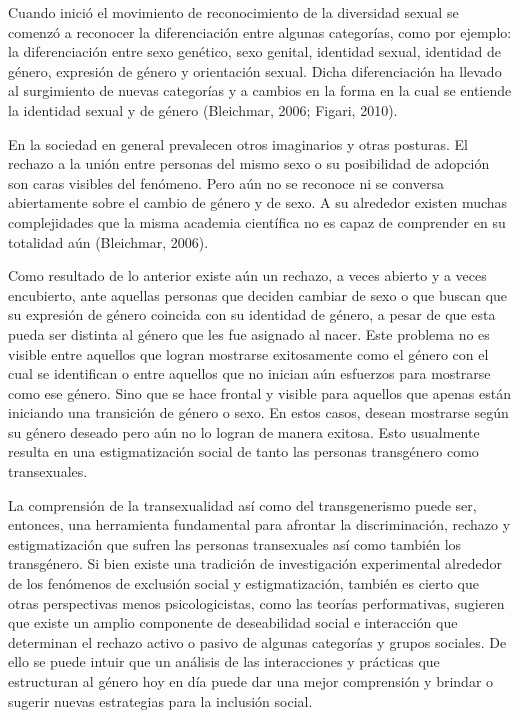 Cuando inició el movimiento de reconocimiento de la diversidad sexual se
comenzó a reconocer la diferenciación entre algunas categorías, como por
ejemplo: la diferenciación entre sexo genético, sexo genital, identidad
sexual, identidad de género, expresión de género y orientación sexual.
Dicha diferenciación ha llevado al surgimiento de nuevas categorías y a
cambios en la forma en la cual se entiende la identidad sexual y de género
(Bleichmar, 2006; Figari, 2010).

En la sociedad en general prevalecen otros imaginarios y otras posturas.
El rechazo a la unión entre personas del mismo sexo o su posibilidad de adopción
son caras visibles del fenómeno.
Pero aún no se reconoce ni se conversa abiertamente sobre el cambio de género y
de sexo.
A su alrededor existen muchas complejidades que la misma academia científica no
es capaz de comprender en su totalidad aún (Bleichmar, 2006).

Como resultado de lo anterior existe aún un rechazo, a veces abierto y a veces
encubierto, ante aquellas personas que deciden cambiar de sexo o que buscan que
su expresión de género coincida con su identidad de género, a pesar de que esta
pueda ser distinta al género que les fue asignado al nacer.
Este problema no es visible entre aquellos que logran mostrarse exitosamente
como el género con el cual se identifican o entre aquellos que no inician aún
esfuerzos para mostrarse como ese género.
Sino que se hace frontal y visible para aquellos que apenas están iniciando una
transición de género o sexo.
En estos casos, desean mostrarse según su género deseado pero aún no lo logran
de manera exitosa.
Esto usualmente resulta en una estigmatización social de tanto las personas
transgénero como transexuales.

La comprensión de la transexualidad así como del transgenerismo puede ser,
entonces, una herramienta fundamental para afrontar la discriminación, rechazo y
estigmatización que sufren las personas transexuales así como también los
transgénero.
Si bien existe una tradición de investigación experimental alrededor de los
fenómenos de exclusión social y estigmatización, también es cierto que otras
perspectivas menos psicologicistas, como las teorías performativas, sugieren que
existe un amplio componente de deseabilidad social e interacción que determinan
el rechazo activo o pasivo de algunas categorías y grupos sociales.
De ello se puede intuir que un análisis de las interacciones y prácticas que
estructuran al género hoy en día puede dar una mejor comprensión y brindar o
sugerir nuevas estrategias para la inclusión social.

